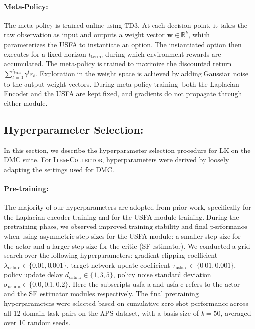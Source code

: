 \documentclass{article}
\theoremstyle{plain}
\theoremstyle{definition}
\theoremstyle{remark}
\begin{document}
\paragraph{Meta-Policy:}
The meta-policy is trained online using TD3. At each decision point, it takes the raw observation as input and outputs a weight vector $\mathbf{w} \in \mathbb{R}^k$, which parameterizes the USFA to instantiate an option. The instantiated option then executes for a fixed horizon $t_{\text{term}}$, during which environment rewards are accumulated. The meta-policy is trained to maximize the discounted return
$
\sum_{t=0}^{t_{\text{term}}} \gamma^{t} r_t
$.
Exploration in the weight space is achieved by adding Gaussian noise to the output weight vectors. During meta-policy training, both the Laplacian Encoder and the USFA are kept fixed, and gradients do not propagate through either module.


\subsection{Hyperparameter Selection:}

In this section, we describe the hyperparameter selection procedure for LK on the DMC suite. For \textsc{Item-Collector}, hyperparameters were derived by loosely adapting the settings used for DMC.



\paragraph{Pre-training:}
The majority of our hyperparameters are adopted from prior work, specifically \citet{gomezproper} for the Laplacian encoder training and \citet{touati2022does} for the USFA module training. 
During the pretraining phase, we observed improved training stability and final performance when using asymmetric step sizes for the USFA module: a smaller step size for the actor and a larger step size for the critic (SF estimator). We conducted a grid search over the following hyperparameters: gradient clipping coefficient $\lambda_{\text{usfa-c}} \in \{0.01, 0.001\}$, target network update coefficient $\tau_{\text{usfa-c}} \in \{0.01, 0.001\}$, policy update delay $d_{\text{usfa-a}} \in \{1, 3, 5\}$, policy noise standard deviation $\sigma_{\text{usfa-a}} \in \{0.0, 0.1, 0.2\}$. Here the subscripts usfa-a and usfa-c refers to the actor and the SF estimator modules respectively. The final pretraining hyperparameters were selected based on cumulative zero-shot performance across all 12 domain-task pairs on the APS dataset, with a basis size of $k=50$, averaged over 10 random seeds. 
\end{document}
